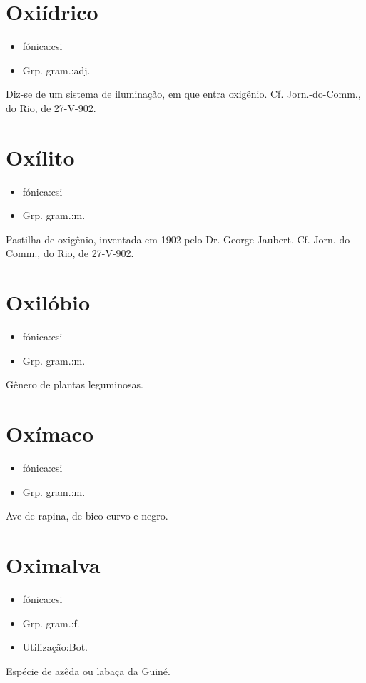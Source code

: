 \section{Oxiídrico}
\begin{itemize}
\item {fónica:csi}
\end{itemize}
\begin{itemize}
\item {Grp. gram.:adj.}
\end{itemize}
Diz-se de um sistema de iluminação, em que entra oxigênio. Cf. \textunderscore Jorn.-do-Comm.\textunderscore , do Rio, de 27-V-902.
\section{Oxílito}
\begin{itemize}
\item {fónica:csi}
\end{itemize}
\begin{itemize}
\item {Grp. gram.:m.}
\end{itemize}
Pastilha de oxigênio, inventada em 1902 pelo Dr. George Jaubert. Cf. \textunderscore Jorn.-do-Comm.\textunderscore , do Rio, de 27-V-902.
\section{Oxilóbio}
\begin{itemize}
\item {fónica:csi}
\end{itemize}
\begin{itemize}
\item {Grp. gram.:m.}
\end{itemize}
Gênero de plantas leguminosas.
\section{Oxímaco}
\begin{itemize}
\item {fónica:csi}
\end{itemize}
\begin{itemize}
\item {Grp. gram.:m.}
\end{itemize}
Ave de rapina, de bico curvo e negro.
\section{Oximalva}
\begin{itemize}
\item {fónica:csi}
\end{itemize}
\begin{itemize}
\item {Grp. gram.:f.}
\end{itemize}
\begin{itemize}
\item {Utilização:Bot.}
\end{itemize}
Espécie de azêda ou labaça da Guiné.
